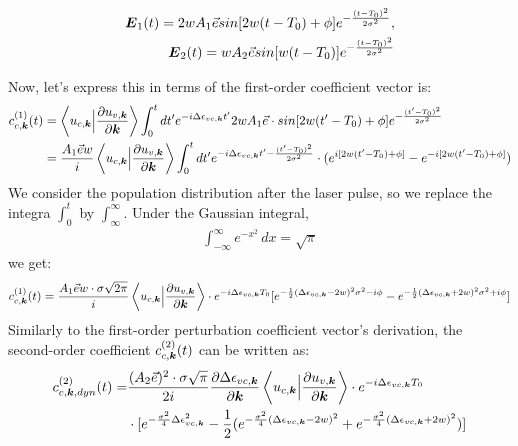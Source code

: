 \begin{align}
   \boldsymbol E_1(t)=2wA_1 \vec e sin[2w(t-T_0)+\phi]  e^{-\frac{(t-T_0)^2}{2\sigma^2}}, \\
   \boldsymbol E_2(t)=wA_2 \vec e sin[w(t-T_0)]  e^{-\frac{(t-T_0)^2}{2\sigma^2}}
   \label{feild}
\end{align}

Now, let's express this in terms of the first-order coefficient vector is:
\begin{equation}
\begin{aligned}
     c^{(1)}_{c,\boldsymbol k}(t) &= \left \langle u_{c,\boldsymbol k}\Big |\frac{\partial u_{v,\boldsymbol k}}{\partial \boldsymbol k} \right \rangle \int_0^t dt' e^{-i \Delta \epsilon_{vc,\boldsymbol k}t'} 
      2wA_1 \vec e \cdot sin[2w(t'-T_0)+\phi]  e^{-\frac{(t'-T_0)^2}{2\sigma^2}}\\
      &=\frac{A_1 \vec e w}{i} \left \langle u_{c,\boldsymbol k}\Big |\frac{\partial u_{v,\boldsymbol k}}{\partial \boldsymbol k} \right \rangle \int_0^t dt' e^{-i \Delta \epsilon_{vc,\boldsymbol k}t' - \frac{(t'-T_0)^2}{2\sigma^2}} 
      \cdot (e^{i[2w(t'-T_0)+\phi]}-e^{-i[2w(t'-T_0)+\phi]}) 
\end{aligned}
\end{equation}
We consider the population distribution after the laser pulse, so we replace the integra $\int_0^t$ by $\int_\infty^\infty$. Under the Gaussian integral, 
\begin{align}
\int_{-\infty}^{\infty} e^{-x^2} \, dx = \sqrt{\pi}
\end{align}
we get:
\begin{equation}
\begin{aligned}
     c^{(1)}_{c,\boldsymbol k}(t) = \frac{A_1 \vec e w \cdot \sigma \sqrt{2\pi}}{i} \left \langle u_{c,\boldsymbol k}\Big |\frac{\partial u_{v,\boldsymbol k}}{\partial \boldsymbol k} \right \rangle \cdot  e^{-i\Delta \epsilon_{vc,\boldsymbol k} T_0}
    [e^{-\frac{1}{2}(\Delta \epsilon_{vc,\boldsymbol k} - 2w)^2 \sigma^2-i\phi}
    -e^{-\frac{1}{2}(\Delta \epsilon_{vc,\boldsymbol k} + 2w)^2 \sigma^2+i\phi}]
\end{aligned}
\end{equation}
Similarly to the first-order perturbation coefficient vector's derivation, the second-order coefficient $c^{(2)}_{c,\boldsymbol k}(t)$ can be written as:
\begin{equation}
\begin{aligned}
    c^{(2)}_{c,\boldsymbol k,dyn}(t)=&\frac{(A_2 \vec e)^2 \cdot \sigma \sqrt{\pi}}{2i} \frac{\partial
    \Delta \epsilon_{vc,\boldsymbol k}}{\partial \boldsymbol k} \left \langle u_{c,\boldsymbol k}\Big |\frac{\partial
u_{v,\boldsymbol k}}{\partial \boldsymbol k} \right \rangle \cdot e^{-i\Delta \epsilon_{vc,\boldsymbol k} T_0}\\
    &\cdot [e^{-\frac{\sigma^2}{4} \Delta \epsilon_{vc,\boldsymbol k} ^2}-\frac{1}{2}(e^{-\frac{\sigma^2}{4} (\Delta \epsilon_{vc,\boldsymbol k}-2w)^2}+e^{-\frac{\sigma^2}{4} (\Delta \epsilon_{vc,\boldsymbol k}+2w)^2})]
\end{aligned}
\end{equation}

